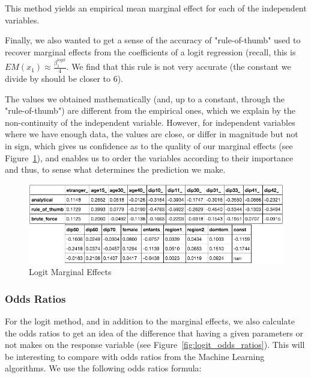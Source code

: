 This method yields an empirical mean marginal effect for each of the independent variables.

Finally, we also wanted to get a sense of the accuracy of "rule-of-thumb" used to recover marginal effects from the coefficients of a logit regression (recall, this is $EM(x_1) \approx \frac{\beta_1^{logit}}{4}$. We find that this rule is not very accurate (the constant we divide by should be closer to $6$).

The values we obtained mathematically (and, up to a constant, through the "rule-of-thumb") are different from the empirical ones, which we explain by the non-continuity of the independent variable. However, for independent variables where we have enough data, the values are close, or differ in magnitude but not in sign, which gives us confidence as to the quality of our marginal effects (see Figure~\ref{fig:logit_marginal_effects}), and enables us to order the variables according to their importance and thus, to sense what determines the prediction we make.


\begin{figure}
    \centering
    \includegraphics[scale=0.4]{img/logit_marginal_effects}
    \caption{Logit Marginal Effects}
    \label{fig:logit_marginal_effects}
\end{figure}

\subsubsection{Odds Ratios}
For the logit method, and in addition to the marginal effects, we also calculate the odds ratios to get an idea of the difference that having a given parameters or not makes on the response variable (see Figure~\ref{fig:logit_odds_ratios}). This will be interesting to compare with odds ratios from the Machine Learning algorithms. We use the following odds ratios formula:

